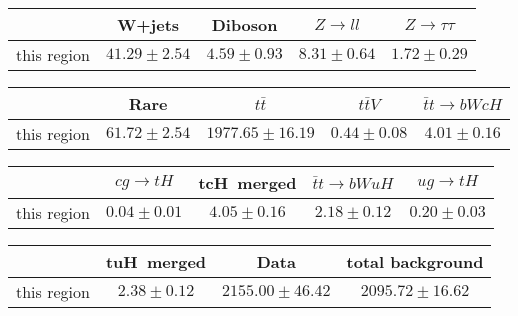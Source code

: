 \centering
\begin{tabular}{|c|c|c|c|c|} \hline
 & W+jets & Diboson & $Z\to ll$ & $Z\to \tau\tau$\\\hline
this region & $41.29\pm2.54$ & $4.59\pm0.93$ & $8.31\pm0.64$ & $1.72\pm0.29$\\\hline
\end{tabular}
\begin{tabular}{|c|c|c|c|c|} \hline
 & Rare & $t\bar{t}$ & $t\bar{t}V$ & $\bar{t}t\to bWcH$\\\hline
this region & $61.72\pm2.54$ & $1977.65\pm16.19$ & $0.44\pm0.08$ & $4.01\pm0.16$\\\hline
\end{tabular}
\begin{tabular}{|c|c|c|c|c|} \hline
 & $cg\to tH$ & tcH~merged & $\bar{t}t\to bWuH$ & $ug\to tH$\\\hline
this region & $0.04\pm0.01$ & $4.05\pm0.16$ & $2.18\pm0.12$ & $0.20\pm0.03$\\\hline
\end{tabular}
\begin{tabular}{|c|c|c|c|} \hline
 & tuH~merged & Data & total background\\\hline
this region & $2.38\pm0.12$ & $2155.00\pm46.42$ & $2095.72\pm16.62$\\\hline
\end{tabular}
